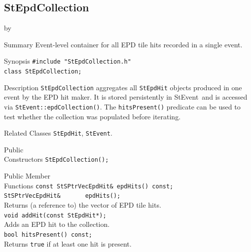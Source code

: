 \documentclass[twoside]{article}
\newcommand{\StEvent}{\textsf{StEvent}}
\newcommand{\entrylabel}[1]{\mbox{\textbf{{#1}}}\hfil}%
\newenvironment{entry}
{\begin{list}{}%
    {\renewcommand{\makelabel}{\entrylabel}%
     \setlength{\labelwidth}{90pt}%
     \setlength{\leftmargin}{\labelwidth}
     \advance\leftmargin by \labelsep%
      }%
    }%
  {\end{list}}
\newcommand{\Entrylabel}[1]%
{\raisebox{0pt}[1ex][0pt]{\makebox[\labelwidth][l]%
    {\parbox[t]{\labelwidth}{\hspace{0pt}\textbf{{#1}}}}}}
\newenvironment{Entry}%
{\renewcommand{\entrylabel}{\Entrylabel}\begin{entry}}%
  {\end{entry}}
\begin{document}
\subsection{StEpdCollection}
\label{sec:StEpdCollection}
\begin{Entry}
\item[Summary] Event-level container for all EPD tile hits recorded in a
    single event.
\item[Synopsis]
    \verb+#include "StEpdCollection.h"+\\
    \verb+class StEpdCollection;+\\
\item[Description]
    \texttt{StEpdCollection} aggregates all \texttt{StEpdHit} objects
    produced in one event by the EPD hit maker.  It is stored persistently
    in \StEvent\ and is accessed via \verb+StEvent::epdCollection()+.
    The \verb+hitsPresent()+ predicate can be used to test whether the
    collection was populated before iterating.
\item[Related Classes]
    \texttt{StEpdHit}, \texttt{StEvent}.
\item[Public\\ Constructors]
    \verb+StEpdCollection();+\\
\item[Public Member\\ Functions]
    \verb+const StSPtrVecEpdHit& epdHits() const;+\\
    \verb+StSPtrVecEpdHit&       epdHits();+\\
    Returns (a reference to) the vector of EPD tile hits.\\
    \verb+void addHit(const StEpdHit*);+\\
    Adds an EPD hit to the collection.\\
    \verb+bool hitsPresent() const;+\\
    Returns \verb+true+ if at least one hit is present.\\
\end{Entry}
\clearpage

\end{document}

